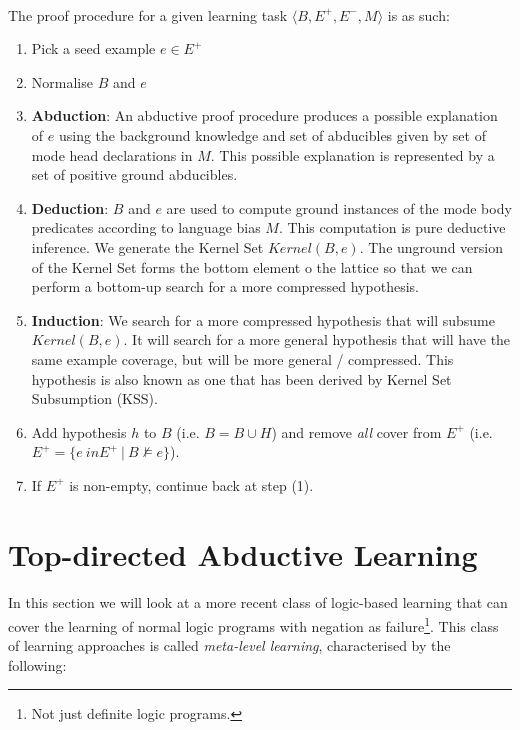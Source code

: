 \documentclass{article}
\theoremstyle{plain}
\theoremstyle{definition}
\begin{document}
\begin{multicols}{2}
\paragraph{} The proof procedure for a given learning task $\langle B, E^+, E^-, M\rangle$ is as such:
\begin{enumerate}
\item Pick a seed example $e \in E^+$
\item Normalise $B$ and $e$
\item \textbf{Abduction}: An abductive proof procedure produces a possible explanation of $e$ using the background knowledge and set of abducibles given by set of mode head declarations in $M$. This possible explanation is represented by a set of positive ground abducibles. 
\item \textbf{Deduction}: $B$ and $e$ are used to compute ground instances of the mode body predicates according to language bias $M$. This computation is pure deductive inference. We generate the Kernel Set $Kernel(B, e)$. The unground version of the Kernel Set forms the bottom element o the lattice so that we can perform a bottom-up search for a more compressed hypothesis. 
\item \textbf{Induction}: We search for a more compressed hypothesis that will subsume $Kernel(B, e)$. It will search for a more general hypothesis that will have the same example coverage, but will be more general / compressed. This hypothesis is also known as one that has been derived by Kernel Set Subsumption (KSS).
\item Add hypothesis $h$ to $B$ (i.e. $B = B \cup H$) and remove \textit{all} cover from $E^+$ (i.e. $E^+ = \{e \ in E^+\ |\ B \not\models e\}$).
\item If $E^+$ is non-empty, continue back at step (1).
\end{enumerate}

\section{Top-directed Abductive Learning}

\paragraph{} In this section we will look at a more recent class of logic-based learning that can cover the learning of normal logic programs with negation as failure\footnote{Not just definite logic programs.}. This class of learning approaches is called \textit{meta-level learning}, characterised by the following:


\end{multicols}
\end{document}
